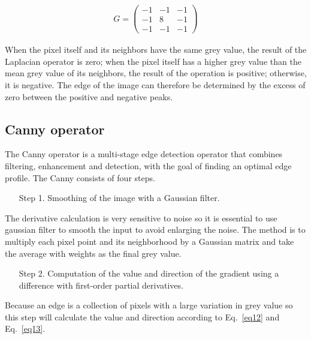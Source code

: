 \documentclass[hyperref]{article}
\theoremstyle{nonumberplain}
\begin{document}
	\begin{equation}
	\begin{aligned}
	G=\begin{pmatrix}
	-1 &-1  &-1 \\ 
	-1 &8  &-1 \\ 
	-1 &-1  &-1 
	\end{pmatrix}
	\end{aligned}
	\label{eq20}
	\end{equation}
	
	When the pixel itself and its neighbors have the same grey value, the result of the Laplacian operator is zero; when the pixel itself has a higher grey value than the mean grey value of its neighbors, the result of the operation is positive; otherwise, it is negative. The edge of the image can therefore be determined by the excess of zero between the positive and negative peaks.
	
	\subsection{Canny operator}
	
	\hspace{1.0em}
	The Canny operator is a multi-stage edge detection operator that combines filtering, enhancement and detection, with the goal of finding an optimal edge profile. The Canny consists of four steps.
	
	\begin{itemize}
		\item[Step 1.]  Smoothing of the image with a Gaussian filter.
	\end{itemize}
	
	The derivative calculation is very sensitive to noise so it is essential to use gaussian filter to smooth the input to avoid enlarging the noise. The method is to multiply each pixel point and its neighborhood by a Gaussian matrix and take the average with weights as the final grey value.
	
	\begin{itemize}
		\item[Step 2.]  Computation of the value and direction of the gradient using a difference with first-order partial derivatives.
	\end{itemize}
	
	Because an edge is a collection of pixels with a large variation in grey value so this step will calculate the value and direction according to Eq.~\ref{eq12} and Eq.~\ref{eq13}.
	
\end{document}
